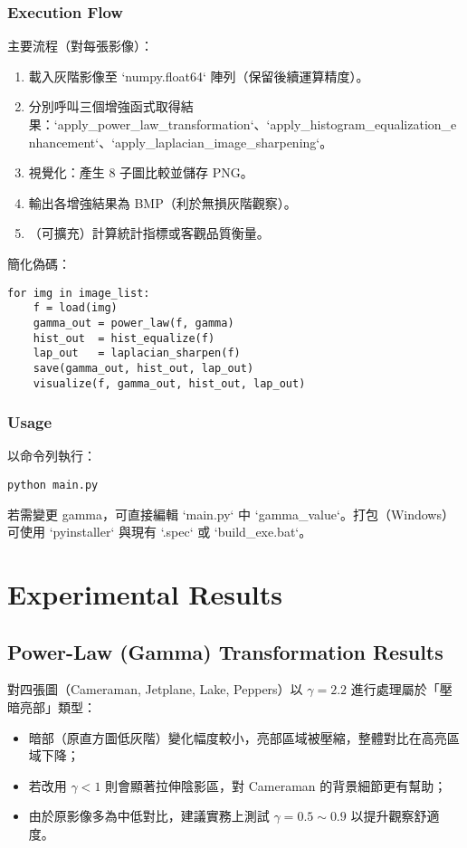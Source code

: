 \documentclass[12pt,a4paper]{article}
\begin{document}
\subsubsection{Execution Flow}
主要流程（對每張影像）：
\begin{enumerate}
  \item 載入灰階影像至 `numpy.float64` 陣列（保留後續運算精度）。
  \item 分別呼叫三個增強函式取得結果：`apply_power_law_transformation`、`apply_histogram_equalization_enhancement`、`apply_laplacian_image_sharpening`。
  \item 視覺化：產生 8 子圖比較並儲存 PNG。
  \item 輸出各增強結果為 BMP（利於無損灰階觀察）。
  \item （可擴充）計算統計指標或客觀品質衡量。
\end{enumerate}
簡化偽碼：
\begin{verbatim}
for img in image_list:
    f = load(img)
    gamma_out = power_law(f, gamma)
    hist_out  = hist_equalize(f)
    lap_out   = laplacian_sharpen(f)
    save(gamma_out, hist_out, lap_out)
    visualize(f, gamma_out, hist_out, lap_out)
\end{verbatim}
\subsubsection{Usage}
以命令列執行：
\begin{verbatim}
python main.py
\end{verbatim}
若需變更 gamma，可直接編輯 `main.py` 中 `gamma_value`。打包（Windows）可使用 `pyinstaller` 與現有 `.spec` 或 `build_exe.bat`。

\section{Experimental Results}
\subsection{Power-Law (Gamma) Transformation Results}
對四張圖（Cameraman, Jetplane, Lake, Peppers）以 \(\gamma=2.2\) 進行處理屬於「壓暗亮部」類型：
\begin{itemize}
  \item 暗部（原直方圖低灰階）變化幅度較小，亮部區域被壓縮，整體對比在高亮區域下降；
  \item 若改用 \(\gamma < 1\) 則會顯著拉伸陰影區，對 Cameraman 的背景細節更有幫助；
  \item 由於原影像多為中低對比，建議實務上測試 \(\gamma=0.5\sim0.9\) 以提升觀察舒適度。
\end{itemize}
\end{document}
